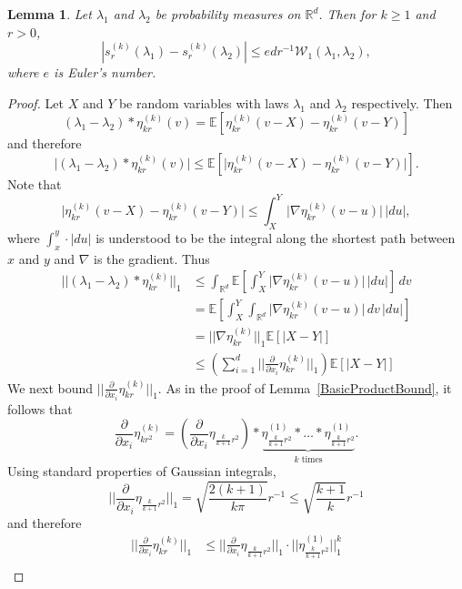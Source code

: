 \documentclass[10pt, english,oneside,reqno]{amsart}
\theoremstyle{plain}
\newtheorem{lemma}[theorem]{Lemma}
\theoremstyle{remark}
\numberwithin{equation}{section}
\numberwithin{figure}{section}
\newcommand{\R}{\mathbb{R}}
\newcommand{\E}{\mathbb{E}}
\begin{document}
\begin{lemma}\label{DetailWassersteinBound}
    Let $\lambda_1$ and $\lambda_2$ be probability measures on $\R^d$. Then for $k \geq 1$ and $r > 0$, $$|s_r^{(k)}(\lambda_1) - s_r^{(k)}(\lambda_2)| \leq edr^{-1}\mathcal{W}_1(\lambda_1, \lambda_2),$$ where $e$ is Euler's number. 
\end{lemma}

\begin{proof}
    Let $X$ and $Y$ be random variables with laws $\lambda_1$ and $\lambda_2$ respectively. Then $$(\lambda_1 - \lambda_2)*\eta^{(k)}_{kr}(v) = \E\left[ \eta^{(k)}_{kr}(v-X)  -  \eta^{(k)}_{kr}(v-Y)  \right]$$ and therefore $$\big|(\lambda_1 - \lambda_2)*\eta^{(k)}_{kr}(v)\big| \leq \E\left[\big| \eta^{(k)}_{kr}(v-X)  -  \eta^{(k)}_{kr}(v-Y)  \big|\right].$$ Note that  $$\big| \eta^{(k)}_{kr}(v-X)  -  \eta^{(k)}_{kr}(v-Y)  \big| \leq \int_X^Y \big| \nabla \eta^{(k)}_{kr}(v-u) \big| \, |du|,$$ where $\int_x^y \cdot |du|$ is understood to be the integral along the shortest path between $x$ and $y$ and $\nabla$ is the gradient. Thus 
    \begin{align*}
        ||(\lambda_1 - \lambda_2)*\eta^{(k)}_{kr}||_1 &\leq \int_{\R^d}  \E\left[\int_X^Y \big| \nabla \eta^{(k)}_{kr}(v-u) \big| \, |du| \right]  \, dv \\
        &=   \E\left[\int_X^Y \int_{\R^d} \big| \nabla \eta^{(k)}_{kr}(v-u) \big|  \, dv  \, |du| \right] \\
        &= ||\nabla \eta_{kr}^{(k)}||_1  \E[|X-Y|] \\
        &\leq \left( \sum_{i = 1}^d \bigg|\bigg|\frac{\partial}{\partial x_i}\eta^{(k)}_{kr}\bigg|\bigg|_1 \right) \E[|X-Y|]
    \end{align*} We next bound $||\frac{\partial}{\partial x_i}\eta^{(k)}_{kr}||_1$. As in the proof of Lemma~\ref{BasicProductBound}, it follows that $$\frac{\partial}{\partial x_i}\eta^{(k)}_{kr^2}  = \left(\frac{\partial}{\partial x_i}\eta_{\frac{k}{k+1} r^2}\right) * \underbrace{\eta^{(1)}_{\frac{k}{k+1} r^2} * \ldots  * \eta^{(1)}_{\frac{k}{k+1} r^2}}_{k\text{ times}}.$$ Using standard properties of Gaussian integrals, $$\bigg|\bigg|\frac{\partial}{\partial x_i}\eta_{\frac{k}{k+1} r^2}\bigg|\bigg|_1 = \sqrt{\frac{2(k + 1)}{k\pi }} r^{-1} \leq \sqrt{\frac{k + 1}{k}} r^{-1}$$ and therefore 
    \begin{align*}
      \bigg|\bigg|\frac{\partial}{\partial x_i}\eta^{(k)}_{kr}\bigg|\bigg|_1 &\leq \bigg|\bigg|\frac{\partial}{\partial x_i}\eta_{\frac{k}{k+1} r^2}\bigg|\bigg|_1 \cdot \big|\big|\eta^{(1)}_{\frac{k}{k+1} r^2}\big|\big|_1^k \\

\end{align*}
\end{proof}
\end{document}
